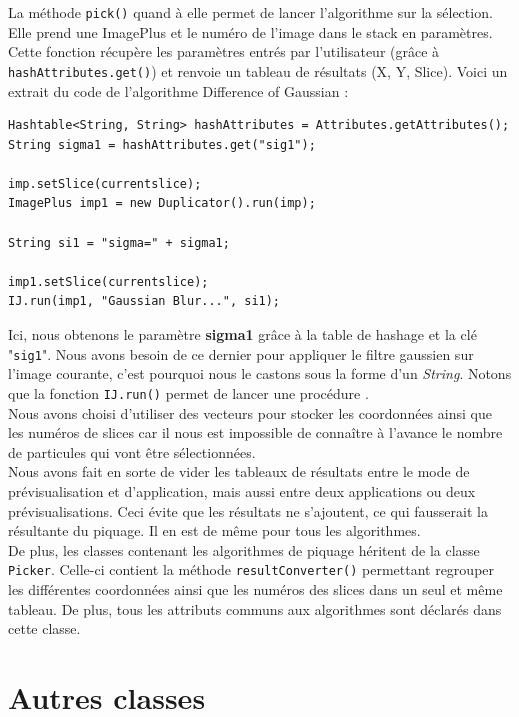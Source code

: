 La méthode \texttt{pick()} quand à elle permet de lancer l'algorithme sur la sélection. Elle prend une ImagePlus et le numéro de l'image dans le stack en paramètres. Cette fonction récupère les paramètres entrés par l'utilisateur (grâce à \texttt{hashAttributes.get()}) et renvoie un tableau de résultats (X, Y, Slice). Voici un extrait du code de l'algorithme Difference of Gaussian :

\begin{small}
\begin{lstlisting}
Hashtable<String, String> hashAttributes = Attributes.getAttributes();
String sigma1 = hashAttributes.get("sig1");

imp.setSlice(currentslice);
ImagePlus imp1 = new Duplicator().run(imp);

String si1 = "sigma=" + sigma1;

imp1.setSlice(currentslice);
IJ.run(imp1, "Gaussian Blur...", si1);
\end{lstlisting}
\end{small}

Ici, nous obtenons le paramètre \textbf{sigma1} grâce à la table de hashage et la clé "\texttt{sig1}". Nous avons besoin de ce dernier pour appliquer le filtre gaussien sur l'image courante, c'est pourquoi nous le castons sous la forme d'un \emph{String}. Notons que la fonction \texttt{IJ.run()} permet de lancer une procédure \imj. \\

Nous avons choisi d'utiliser des vecteurs pour stocker les coordonnées ainsi que les numéros de slices car il nous est impossible de connaître à l'avance le nombre de particules qui vont être sélectionnées. \\
Nous avons fait en sorte de vider les tableaux de résultats entre le mode de prévisualisation et d'application, mais aussi entre deux applications ou deux prévisualisations. Ceci évite que les résultats ne s'ajoutent, ce qui fausserait la résultante du piquage. Il en est de même pour tous les algorithmes. \\

De plus, les classes contenant les algorithmes de piquage héritent de la classe \texttt{Picker}. Celle-ci contient la méthode \texttt{resultConverter()} permettant regrouper les différentes coordonnées ainsi que les numéros des slices dans un seul et même tableau. De plus, tous les attributs communs aux algorithmes sont déclarés dans cette classe. \\

\section{Autres classes}

